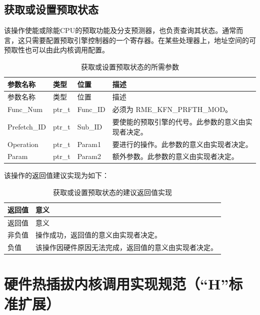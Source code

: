 \subsection{获取或设置预取状态}\label{subsec:8-get-or-set-prefetch-state}

该操作使能或除能CPU的预取功能及分支预测器，也负责查询其状态。通常而言，这只需要配置预取引擎控制器的一个寄存器。在某些处理器上，地址空间的可预取性也可以由此内核调用配置。

\begin{xltabular}{\textwidth}{@{}>{\hsize\raggedright\arraybackslash}X>{\hsize\raggedright\arraybackslash}X>{\hsize\raggedright\arraybackslash}X>{\hsize\raggedright\arraybackslash}X@{}}
\caption{获取或设置预取状态的所需参数}\label{tab:8-33-get-or-set-prefetch-state-parameters}\\
\toprule
参数名称 & 类型 & 位置 & 描述\tabularnewline
\endfirsthead
\toprule
参数名称 & 类型 & 位置 & 描述\tabularnewline
\midrule
\endhead
\bottomrule
\endlastfoot
Func\_Num & ptr\_t & Func\_ID & 必须为 RME\_KFN\_PRFTH\_MOD。\tabularnewline
Prefetch\_ID & ptr\_t & Sub\_ID &
要使能的预取引擎的代号。此参数的意义由实现者决定。\tabularnewline
Operation & ptr\_t & Param1 &
要进行的操作。此参数的意义由实现者决定。\tabularnewline
Param & ptr\_t & Param2 &
额外参数。此参数的意义由实现者决定。\tabularnewline
\end{xltabular}

该操作的返回值建议实现为如下：

\begin{xltabular}{\textwidth}{@{}>{\hsize\raggedright\arraybackslash}X>{\hsize\raggedright\arraybackslash}X@{}}
\caption{获取或设置预取状态的建议返回值实现}\label{tab:8-34-get-or-set-prefetch-state-suggested-return-values}\\
\toprule
返回值 & 意义\tabularnewline
\endfirsthead
\toprule
返回值 & 意义\tabularnewline
\midrule
\endhead
\bottomrule
\endlastfoot
    非负值 & 操作成功，返回值的意义由实现者决定。\tabularnewline
    负值 & 该操作因硬件原因无法完成，返回值的意义由实现者决定。\tabularnewline
\end{xltabular}

\section{硬件热插拔内核调用实现规范（``H''标准扩展）}\label{sec:8-hardware-hotplug-kernel-calls}
\nopagebreak[4]

